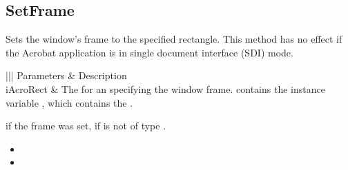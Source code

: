 \documentclass[letterpaper,12pt,english,openany,oneside]{sphinxmanual}
\begin{document}
\subsection{SetFrame}
\label{\detokenize{IAC_API_OLE_Objects:setframe}}
Sets the window’s frame to the specified rectangle. This method has no effect if the Acrobat application is in single document interface (SDI) mode.


\begin{sphinxVerbatim}[commandchars=\\\{\}]
  
\end{sphinxVerbatim}
\label{\detokenize{IAC_API_OLE_Objects:parameters-13}}


\begin{savenotes}\sphinxattablestart
\centering
{}\label{\detokenize{IAC_API_OLE_Objects:section-15}}\nobreak
\begin{tabular}[t]{|||}
\hline
\sphinxstyletheadfamily 
Parameters
&\sphinxstyletheadfamily 
Description
\\
\hline
iAcroRect
&
The  for an  specifying the window frame.  contains the instance variable , which contains the .
\\
\hline
\end{tabular}
\par
\sphinxattableend\end{savenotes}


 if the frame was set,  if  is not of type .

\label{\detokenize{IAC_API_OLE_Objects:related-methods-20}}
\begin{itemize}
\item {} 
 

\item {} 
 

\end{itemize}
\end{document}
